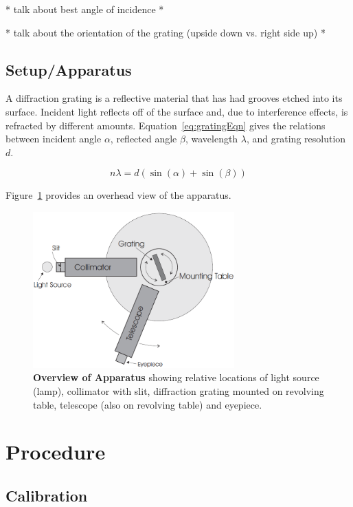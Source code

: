 \documentclass[paper=a4, fontsize=11pt]{scrartcl} %
\numberwithin{equation}{section}
\numberwithin{figure}{section}
\numberwithin{table}{section}
\begin{document}
* talk about best angle of incidence *

* talk about the orientation of the grating (upside down vs. right side up) *

\subsection{Setup/Apparatus}

A diffraction grating is a reflective material that has had grooves etched into its surface. Incident light reflects off of the surface and, due to interference effects, is refracted by different amounts. Equation~\ref{eq:gratingEqn} gives the relations between incident angle $\alpha$, reflected angle $\beta$, wavelength $\lambda$, and grating resolution $d$.

\begin{equation} \label{eq:gratingEqn}
n \lambda = d ( \sin(\alpha) + \sin(\beta))
\end{equation}

Figure~\ref{fig:diagram1} provides an overhead view of the apparatus.


\begin{figure}[H] \begin{center}
  \includegraphics[height=60mm]{diagram1.png}
  \caption{\textbf{Overview of Apparatus} showing relative locations of light source (lamp), collimator with slit, diffraction grating mounted on revolving table, telescope (also on revolving table) and eyepiece.}
  \label{fig:diagram1}
\end{center} \end{figure}



\section{Procedure}

\subsection{Calibration}
\end{document}

